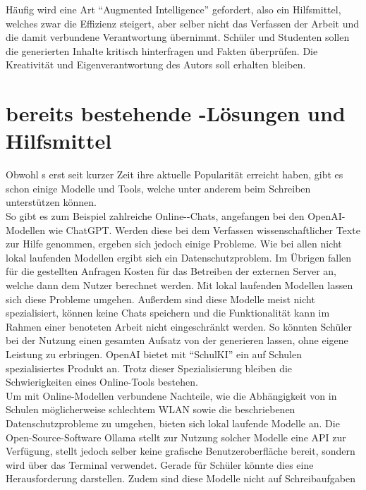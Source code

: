\documentclass[../main.tex]{subfiles}
\begin{document}
Häufig wird eine Art "`Augmented Intelligence"' gefordert, also ein Hilfsmittel, welches zwar die Effizienz steigert, aber selber nicht das Verfassen der 
Arbeit und die damit verbundene Verantwortung übernimmt. Schüler und Studenten sollen die generierten Inhalte kritisch hinterfragen und Fakten überprüfen. Die Kreativität und 
Eigenverantwortung des Autors soll erhalten bleiben.\cite{BucherSchwarzerHolzwweißig,humanWritingToAi,teachers,ZukunftWissenschaftlichesPublizieren} 

\section{bereits bestehende -Lösungen und Hilfsmittel}
\label{sec:bereitsBestehendeLoesungen}

Obwohl s erst seit kurzer Zeit ihre aktuelle Popularität erreicht haben, gibt es schon einige Modelle und Tools, welche unter anderem beim Schreiben unterstützen können. \\
So gibt es zum Beispiel zahlreiche Online--Chats, angefangen bei den OpenAI-Modellen wie ChatGPT. Werden diese bei dem Verfassen wissenschaftlicher Texte zur Hilfe genommen, ergeben 
sich jedoch einige Probleme. Wie bei allen nicht lokal laufenden Modellen ergibt sich ein Datenschutzproblem. Im Übrigen fallen für die gestellten Anfragen Kosten für das Betreiben der 
externen Server an, welche dann dem Nutzer berechnet werden. Mit lokal laufenden Modellen lassen sich diese Probleme umgehen. Außerdem sind diese Modelle meist nicht spezialisiert, 
können keine Chats speichern und die Funktionalität kann im Rahmen einer benoteten Arbeit nicht eingeschränkt werden. So könnten Schüler bei der Nutzung einen gesamten Aufsatz von 
der  generieren lassen, ohne eigene Leistung zu erbringen. OpenAI bietet mit "`SchulKI"' ein auf Schulen spezialisiertes Produkt an. Trotz dieser Spezialisierung bleiben die 
Schwierigkeiten eines Online-Tools bestehen.\cite{schulki}\\ 
Um mit Online-Modellen verbundene Nachteile, wie die Abhängigkeit von in Schulen möglicherweise schlechtem WLAN sowie die beschriebenen Datenschutzprobleme zu umgehen, bieten sich 
lokal laufende Modelle an. Die Open-Source-Software Ollama stellt zur Nutzung solcher Modelle eine API zur Verfügung, stellt jedoch selber keine grafische 
Benutzeroberfläche bereit, sondern wird über das Terminal verwendet. Gerade für Schüler könnte dies eine Herausforderung darstellen. Zudem sind diese Modelle nicht auf Schreibaufgaben 
\end{document}
